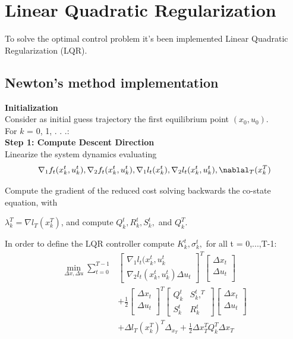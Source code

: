 \documentclass[a4paper,11pt,oneside]{book}
\begin{document}
\newpage
\section{Linear Quadratic Regularization}
To solve the optimal control problem it's been implemented Linear Quadratic Regularization (LQR).
\subsection{Newton's method implementation}
\textbf{Initialization}\\
Consider as initial guess trajectory the first equilibrium point $(x_0, u_0)$.\\
For $k$ = 0, 1, . . .:\\

\textbf{Step 1: Compute Descent Direction}\\

Linearize the system dynamics evaluating\\
\begin{align*}
\nabla_1 f_t(x_k^t, u_k^t), \nabla_2 f_t(x_k^t,u_k^t),\nabla_1l_t(x_k^t),\nabla_2l_t(x_k^t,u_k^t),\nablal_T(x_k^T)\\
\end{align*}

Compute the gradient of the reduced cost solving backwards the co-state equation, with

$\lambda_k^T=\nabla l_T(x_k^T)$, and compute $Q_k^t,R_k^t,S_k^t,$ and $Q_k^T$.

In order to define the LQR controller compute $K_k^t,\sigma_k^t,$ for all t = 0,...,T-1:\\
\begin{align*}
    \min_{\Delta x,\Delta u} \sum_{t=0}^{T-1}&
    \begin{bmatrix}
    \nabla_1 l_t(x_k^t,u_k^t\\
    \nabla_2 l_t(x_k^t,u_k^t)\Delta u_t
    \end{bmatrix}^T
    \begin{bmatrix}
           \Delta x_t \\
           \Delta u_t \\ 
           \end{bmatrix}\\
    &+\frac{1}{2}\begin{bmatrix}
           \Delta x_t \\
           \Delta u_t \\ 
           \end{bmatrix}^T
    \begin{bmatrix}
    Q_k^t & S_k^t,^T\\
    S_k^t & R_k^t
    \end{bmatrix}
    \begin{bmatrix}
           \Delta x_t \\
           \Delta u_t \\ 
           \end{bmatrix}\\
    &+\Delta l_T(x_k^T)^T \Delta_x_T+\frac{1}{2}\Delta x_T^T Q_k^T \Delta x_T\\
\end{align*}
\end{document}
